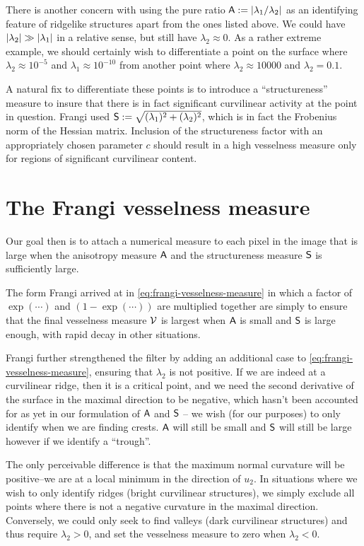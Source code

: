 There is another concern with using the pure ratio $\Am:= \abs{\lambda_1 / \lambda_2}$ as an identifying feature of ridgelike structures apart from the ones listed above. We could have $\abs*{\lambda_2} \gg \abs*{\lambda_1}$ in a relative sense, but still have $\lambda_2 \approx 0$. As a rather extreme example, we should certainly wish to differentiate a point on the surface where $\lambda_2 \approx 10^{-5} $ and $\lambda_1 \approx 10^{-10}$ from another point where $\lambda_2 \approx 10000$ and $\lambda_2 = 0.1$.

A natural fix to differentiate these points is to introduce a ``structureness'' measure to insure that there is in fact significant curvilinear activity at the point in question. Frangi used $\Sm:= \sqrt{(\lambda_1)^2 + (\lambda_2)^2}$, which is in fact the Frobenius norm of the Hessian matrix. Inclusion of the structureness factor with an appropriately chosen parameter $c$ should result in a high vesselness measure only for regions of significant curvilinear content.


\section{The Frangi vesselness measure}

Our goal then is to attach a numerical measure to each pixel in the image %
that is large when the anisotropy measure $\Am$ and the structureness measure $\Sm$ is sufficiently large.

The form Frangi arrived at in \cref{eq:frangi-vesselness-measure} in which a factor of $\exp(\cdots)$ and $(1 - \exp(\cdots))$ are multiplied together are simply to ensure that the final vesselness measure $\V$ is largest when $\Am$ is small and $\Sm$ is large enough, with rapid decay in other situations.

Frangi further strengthened the filter by adding an additional case to \cref{eq:frangi-vesselness-measure}, ensuring that $\lambda_2$ is not positive. If we are indeed at a curvilinear ridge, then it is a critical point, and we need the second derivative of the surface in the maximal direction to be negative, which hasn't been accounted for as yet in our formulation of $\Am$ and $\Sm$ -- we wish (for our purposes) to only identify when we are finding crests. $\Am$ will still be small and $\Sm$ will still be large however if we identify a ``trough''.

The only perceivable difference is that the maximum normal curvature will be positive--we are at a local minimum in the direction of $u_2$. In situations where we wish to only identify ridges (bright curvilinear structures), we simply exclude all points where there is not a negative curvature in the maximal direction. Conversely, we could only seek to find valleys (dark curvilinear structures) and thus require $\lambda_2 > 0$, and set the vesselness measure to zero when $\lambda_2 < 0$.



